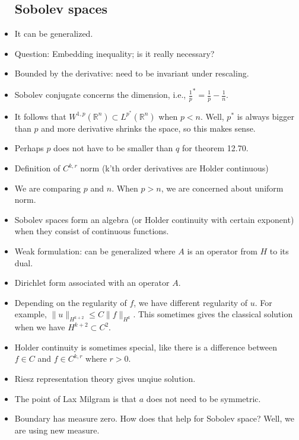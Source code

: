 \documentclass{article}
\theoremstyle{remark}
\begin{document}
\begin{itemize}
\subsection*{Sobolev spaces}
\item It can be generalized.
\item Question: Embedding inequality; is it really necessary?
\item Bounded by the derivative: need to be invariant under rescaling.
\item Sobolev conjugate concerns the dimension, i.e., $\frac 1p^*=\frac1p-\frac1n$.
\item It follows that $W^{1,p}(\mathbb{R}^n)\subset L^{p^*}(\mathbb{R}^n)$ when $p<n$. Well, $p^*$ is always bigger than $p$ and more derivative shrinks the space, so this makes sense.
\item Perhaps $p$ does not have to be smaller than $q$ for theorem 12.70.
\item Definition of $C^{k,r}$ norm (k'th order derivatives are Holder continuous)
\item We are comparing $p$ and $n$. When $p>n$, we are concerned about uniform norm.
\item Sobolev spaces form an algebra (or Holder continuity with certain exponent) when they consist of continuous functions. 
\item Weak formulation: can be generalized where $A$ is an operator from $H$ to its dual.
\item Dirichlet form associated with an operator $A$.
\item Depending on the regularity of $f$, we have different regularity of $u$. For example, $\lVert u\rVert_{H^{k+2}}\leq C\lVert f\rVert_{H^k}$. This sometimes gives the classical solution when we have $H^{k+2}\subset C^2$.
\item Holder continuity is sometimes special, like there is a difference between $f\in C$ and $f\in C^{k,r}$ where $r>0$.
\item Riesz representation theory gives unqiue solution.
\item The point of Lax Milgram is that $a$ does not need to be symmetric.
\item Boundary has measure zero. How does that help for Sobolev space? Well, we are using new measure.


\end{itemize}
\end{document}
